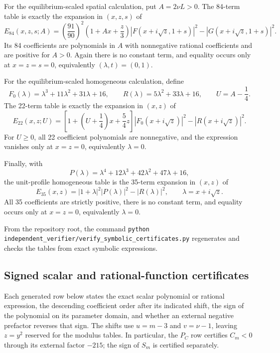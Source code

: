 \documentclass[10pt]{article}
\newcommand{\1}{\mathbf1}
\begin{document}
For the equilibrium-scaled spatial calculation, put $A=2\nu L>0$.  The
84-term table is exactly the expansion in $(x,z,s)$ of
\[
 E_{84}(x,z,s;A)=
 \left(\frac{91}{90}\right)^2
 \left(1+Ax+\frac z3\right)
 \left|F(x+i\sqrt z,1+s)\right|^2
 -\left|G(x+i\sqrt z,1+s)\right|^2.
\]
Its 84 coefficients are polynomials in $A$ with nonnegative rational
coefficients and are positive for $A>0$.  Again there is no constant term,
and equality occurs only at $x=z=s=0$, equivalently
$(\lambda,t)=(0,1)$.

For the equilibrium-scaled homogeneous calculation, define
\[
 F_0(\lambda)=\lambda^3+11\lambda^2+31\lambda+16,
 \qquad R(\lambda)=5\lambda^2+33\lambda+16,
 \qquad U=A-\frac14.
\]
The 22-term table is exactly the expansion in $(x,z)$ of
\[
 E_{22}(x,z;U)=
 \left[1+\left(U+\frac14\right)x+\frac54z\right]
 |F_0(x+i\sqrt z)|^2-|R(x+i\sqrt z)|^2.
\]
For $U\ge0$, all 22 coefficient polynomials are nonnegative, and the
expression vanishes only at $x=z=0$, equivalently $\lambda=0$.

Finally, with
\[
 P(\lambda)=\lambda^4+12\lambda^3+42\lambda^2+47\lambda+16,
\]
the unit-profile homogeneous table is the 35-term expansion in $(x,z)$ of
\[
 E_{35}(x,z)=|1+\lambda|^2|P(\lambda)|^2-|R(\lambda)|^2,
 \qquad \lambda=x+i\sqrt z.
\]
All 35 coefficients are strictly positive, there is no constant term, and
equality occurs only at $x=z=0$, equivalently $\lambda=0$.

From the repository root, the command
\texttt{python independent\_verifier/verify\_symbolic\_certificates.py}
regenerates and checks the tables from exact symbolic expressions.



\subsection{Signed scalar and rational-function certificates}

Each generated row below states the exact scalar polynomial or rational
expression, the descending coefficient order after its indicated shift, the
sign of the polynomial on its parameter domain, and whether an external
negative prefactor reverses that sign.  The shifts use $u=m-3$ and
$v=\nu-1$, leaving $z=y^2$ reserved for the modulus tables.  In particular,
the $P_C$ row certifies $C_m<0$ through its external factor $-215$; the sign
of $S_m$ is certified separately.


\end{document}
